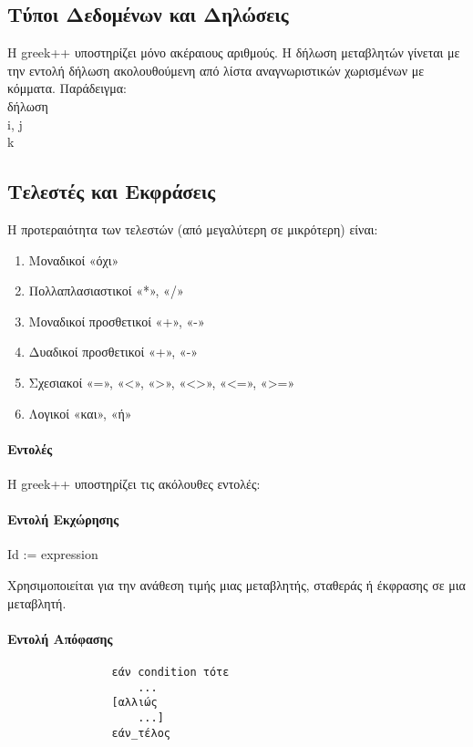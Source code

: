 \documentclass[12pt,a4paper]{article}
\begin{document}
    \subsection{Τύποι Δεδομένων και Δηλώσεις}
        Η greek++ υποστηρίζει μόνο ακέραιους αριθμούς.
        Η δήλωση μεταβλητών γίνεται με την εντολή δήλωση ακολουθούμενη από λίστα αναγνωριστικών χωρισμένων με κόμματα.
        Παράδειγμα:\\
        δήλωση\\
        i, j\\
        k\\

    \subsection{Τελεστές και Εκφράσεις}
        Η προτεραιότητα των τελεστών (από μεγαλύτερη σε μικρότερη) είναι:
        \begin{enumerate}
            \item Μοναδικοί «όχι»
            \item Πολλαπλασιαστικοί «*», «/»
            \item Μοναδικοί προσθετικοί «+», «-»
            \item Δυαδικοί προσθετικοί «+», «-»
            \item Σχεσιακοί «=», «<», «>», «<>», «<=», «>=»
            \item Λογικοί «και», «ή»
        \end{enumerate}
    \paragraph{Εντολές}
        Η greek++ υποστηρίζει τις ακόλουθες εντολές:


        \paragraph{Εντολή Εκχώρησης}
            Id := expression

            Χρησιμοποιείται για την ανάθεση τιμής μιας μεταβλητής, σταθεράς ή έκφρασης σε μια μεταβλητή.
        \paragraph{Εντολή Απόφασης}
            \begin{verbatim}
                εάν condition τότε
                    ...
                [αλλιώς
                    ...]
                εάν_τέλος
            \end{verbatim}
\end{document}
